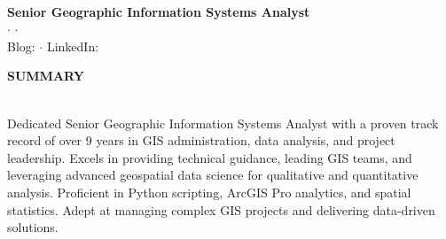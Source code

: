 \documentclass[letterpaper]{article}
\newcommand{\lineunder} {
        \vspace*{-8pt} \\
        \hspace*{-18pt} \hrulefill \\
    }
\newcommand{\header} [1] {
        \vspace{9pt}
        {\hspace*{-18pt}\vspace*{6pt} \large \textbf {#1}}
        \vspace*{-6pt} \lineunder
        \vspace{2pt}
    }
\newcommand{\cvprofile}[7]{ %
        \begin{center}
            {\Huge \textbf {#1}}\\
            \vspace{5pt}
            {\large \textbf {#2}}\\
            \vspace{4pt}
            #3 $\cdot$\enspace #4 $\cdot$\enspace #5\\
            Blog: #6
            $\cdot$\enspace
            LinkedIn: #7
        \end{center}
    }
\newcommand{\CVjobTitle}{Senior Geographic Information Systems Analyst}
\begin{document}



\vspace*{-30pt}

\cvprofile
    {\CVname}
    {\CVjobTitle}
    {\CVaddress}
    {\CVemail}
    {\CVphone}
    {\CVblogurl}
    {\CVlinkedin}

\vspace*{-6pt}



\header{SUMMARY}

Dedicated Senior Geographic Information Systems Analyst with a proven track record of over 9 years in GIS administration, data analysis, and project leadership.
Excels in providing technical guidance, leading GIS teams, and leveraging advanced geospatial data science for qualitative and quantitative analysis.
Proficient in Python scripting, ArcGIS Pro analytics, and spatial statistics.
Adept at managing complex GIS projects and delivering data-driven solutions.
\end{document}
